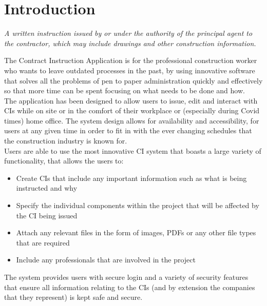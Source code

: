 \documentclass[11pt]{article}
\begin{document}
\section{Introduction}
\begin{center}
\begin{tcolorbox}[skin=widget,
boxrule=1mm,
coltitle=black,
colframe=blue!45!white,
colback=blue!15!white,
width=(.9\linewidth),before=\hfill,after=\hfill,
adjusted title={CONTRACT INSTRUCTION}]
\textit{A written instruction issued by or under the authority of the principal agent to the contractor, which may include drawings and other construction information.}
\tcblower
\cite{ciDefinition}
\end{tcolorbox}
\end{center}
\begin{flushleft}
The Contract Instruction Application is for the professional construction worker who wants to leave outdated processes in the past, by using innovative software that solves all the problems of pen to paper administration quickly and effectively so that more time can be spent focusing on what needs to be done and how.\\[0.5cm]

The application has been designed to allow users to issue, edit and interact with CIs while on site or in the comfort of their workplace or (especially during Covid times) home office. The system design allows for availability and accessibility, for users at any given time in order to fit in with the ever changing schedules that the construction industry is known for.\\[0.5cm]
Users are able to use the most innovative CI system that boasts a large variety of functionality, that allows the users to:\\[0.5cm]
\begin{itemize}
    \item Create CIs that include any important information such as what is being instructed and why
    \item Specify the individual components within the project that will be affected by the CI being issued
    \item Attach any relevant files in the form of images, PDFs or any other file types that are required
    \item Include any professionals that are involved in the project
\end{itemize}
The system provides users with secure login and a variety of security features that ensure all information relating to the CIs (and by extension the companies that they represent) is kept safe and secure.\\[0.5cm]


\end{flushleft}
\end{document}
